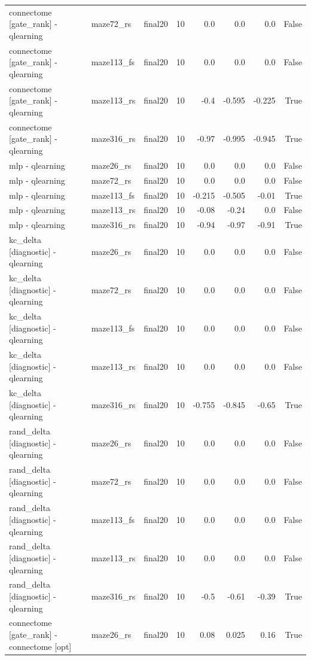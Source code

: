 \begin{table}[t]
\begin{tabular}{lllrrrrr}
connectome [gate\_rank] - qlearning & maze72\_rs & final20 & 10 & 0.0 & 0.0 & 0.0 & False \\
connectome [gate\_rank] - qlearning & maze113\_fs & final20 & 10 & 0.0 & 0.0 & 0.0 & False \\
connectome [gate\_rank] - qlearning & maze113\_rs & final20 & 10 & -0.4 & -0.595 & -0.225 & True \\
connectome [gate\_rank] - qlearning & maze316\_rs & final20 & 10 & -0.97 & -0.995 & -0.945 & True \\
mlp - qlearning & maze26\_rs & final20 & 10 & 0.0 & 0.0 & 0.0 & False \\
mlp - qlearning & maze72\_rs & final20 & 10 & 0.0 & 0.0 & 0.0 & False \\
mlp - qlearning & maze113\_fs & final20 & 10 & -0.215 & -0.505 & -0.01 & True \\
mlp - qlearning & maze113\_rs & final20 & 10 & -0.08 & -0.24 & 0.0 & False \\
mlp - qlearning & maze316\_rs & final20 & 10 & -0.94 & -0.97 & -0.91 & True \\
kc\_delta [diagnostic] - qlearning & maze26\_rs & final20 & 10 & 0.0 & 0.0 & 0.0 & False \\
kc\_delta [diagnostic] - qlearning & maze72\_rs & final20 & 10 & 0.0 & 0.0 & 0.0 & False \\
kc\_delta [diagnostic] - qlearning & maze113\_fs & final20 & 10 & 0.0 & 0.0 & 0.0 & False \\
kc\_delta [diagnostic] - qlearning & maze113\_rs & final20 & 10 & 0.0 & 0.0 & 0.0 & False \\
kc\_delta [diagnostic] - qlearning & maze316\_rs & final20 & 10 & -0.755 & -0.845 & -0.65 & True \\
rand\_delta [diagnostic] - qlearning & maze26\_rs & final20 & 10 & 0.0 & 0.0 & 0.0 & False \\
rand\_delta [diagnostic] - qlearning & maze72\_rs & final20 & 10 & 0.0 & 0.0 & 0.0 & False \\
rand\_delta [diagnostic] - qlearning & maze113\_fs & final20 & 10 & 0.0 & 0.0 & 0.0 & False \\
rand\_delta [diagnostic] - qlearning & maze113\_rs & final20 & 10 & 0.0 & 0.0 & 0.0 & False \\
rand\_delta [diagnostic] - qlearning & maze316\_rs & final20 & 10 & -0.5 & -0.61 & -0.39 & True \\
connectome [gate\_rank] - connectome [opt] & maze26\_rs & final20 & 10 & 0.08 & 0.025 & 0.16 & True \\

\end{tabular}
\end{table}
